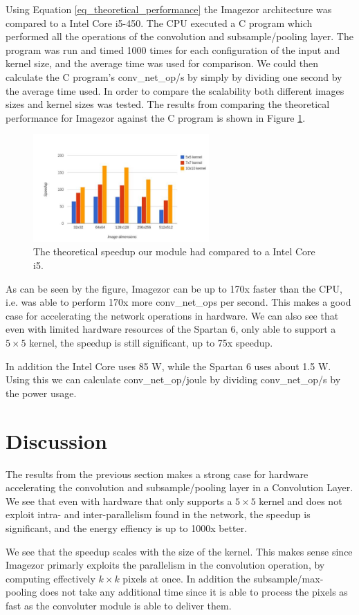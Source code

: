 Using Equation \ref{eq_theoretical_performance} the Imagezor architecture was  compared  to a Intel Core i5-450. The CPU executed a C program which performed all the operations of the convolution and subsample/pooling layer. The program was run and timed 1000 times for each configuration of the input and kernel size, and the average time was used for comparison. We could then calculate the C program's conv\_net\_op/s by simply by dividing one second by the average time used.  In order to compare the scalability both different images sizes and kernel sizes was tested. The results from comparing the theoretical performance for Imagezor against the C program is shown in Figure \ref{fig_cpu_cmp_results}.
\begin{figure}
  \centering
      \includegraphics[width=0.6\textwidth]{Figures/Results/Speedup_chart}
  \caption{The theoretical speedup our module had compared to a Intel Core i5.}
  \label{fig_cpu_cmp_results}
\end{figure}

As can be seen by the figure, Imagezor can be up to 170x faster than the CPU, i.e. was able to perform 170x more conv\_net\_ops per second. This makes a good case for accelerating the network operations in hardware. We can also see that even with limited hardware resources of the Spartan 6, only able to support a $ 5 \times 5 $ kernel, the speedup is still significant, up to 75x speedup.

In addition the Intel Core uses 85 W, while the Spartan 6 uses about 1.5 W. Using this we can calculate conv\_net\_op/joule by dividing conv\_net\_op/s by the power usage. 

\section{Discussion}

The results from the previous section makes a strong case for hardware accelerating the convolution and subsample/pooling layer in a Convolution Layer. We see that even with hardware that only supports a $ 5 \times 5 $ kernel and does not exploit intra- and inter-parallelism found in the network, the speedup is significant, and the energy effiency is up to 1000x better. 

We see that the speedup scales with the size of the kernel. This makes sense since Imagezor primarly exploits the parallelism in the convolution operation, by computing effectively $ k \times k $ pixels at once. In addition the subsample/max-pooling does not take any additional time since it is able to process the pixels as fast as the convoluter module is able to deliver them.   
